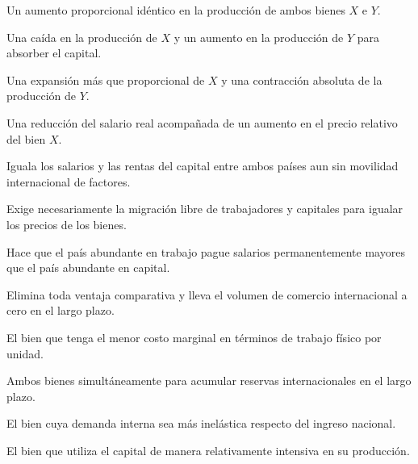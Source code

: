 \begin{opts}
    \item Un aumento proporcional idéntico en la producción de ambos bienes $X$ e $Y$.
    \item Una caída en la producción de $X$ y un aumento en la producción de $Y$ para absorber el capital.
    \item Una expansión más que proporcional de $X$ y una contracción absoluta de la producción de $Y$.
    \item Una reducción del salario real acompañada de un aumento en el precio relativo del bien $X$.
\end{opts}

\begin{opts}
    \item Iguala los salarios y las rentas del capital entre ambos países aun sin movilidad internacional de factores.
    \item Exige necesariamente la migración libre de trabajadores y capitales para igualar los precios de los bienes.
    \item Hace que el país abundante en trabajo pague salarios permanentemente mayores que el país abundante en capital.
    \item Elimina toda ventaja comparativa y lleva el volumen de comercio internacional a cero en el largo plazo.
\end{opts}

\begin{opts}
    \item El bien que tenga el menor costo marginal en términos de trabajo físico por unidad.
    \item Ambos bienes simultáneamente para acumular reservas internacionales en el largo plazo.
    \item El bien cuya demanda interna sea más inelástica respecto del ingreso nacional.
    \item El bien que utiliza el capital de manera relativamente intensiva en su producción.
\end{opts}

